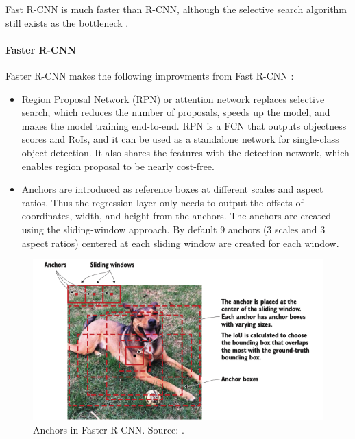 \documentclass[a4paper,11pt,oneside]{article}
\begin{document}
  Fast R-CNN is much faster than R-CNN, although the selective search algorithm still exists as the bottleneck
  \cite{elgendy2020deep, girshick2015fast, ren2015faster}.

  \paragraph{Faster R-CNN}

  Faster R-CNN makes the following improvments from Fast R-CNN \cite{elgendy2020deep, ren2015faster}:

  \begin{itemize}
    \item Region Proposal Network (RPN) or attention network replaces selective search, which reduces the number of
    proposals, speeds up the model, and makes the model training end-to-end. RPN is a FCN that outputs objectness scores
    and RoIs, and it can be used as a standalone network for single-class object detection. It also shares the features
    with the detection network, which enables region proposal to be nearly cost-free.
    \item Anchors are introduced as reference boxes at different scales and aspect ratios. Thus the regression layer
    only needs to output the offsets of coordinates, width, and height from the anchors. The anchors are created using
    the sliding-window approach. By default 9 anchors (3 scales and 3 aspect ratios) centered at each sliding window are
    created for each window.
  \end{itemize}

  \begin{figure}[ht]
    \begin{center}
      \includegraphics[width=.8\textwidth]{anchors.png}
    \end{center}
    \caption{Anchors in Faster R-CNN. Source: \cite{elgendy2020deep}.}
  \end{figure}
\end{document}
